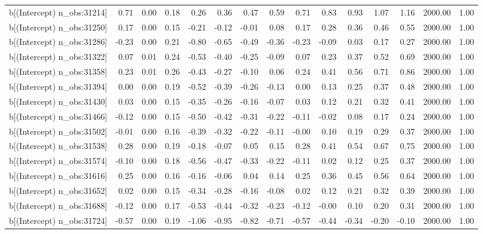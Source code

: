 \begin{table}[ht]
\begin{tabular}{rrrrrrrrrrrrrrr}
  b[(Intercept) n\_obs:31214] & 0.71 & 0.00 & 0.18 & 0.26 & 0.36 & 0.47 & 0.59 & 0.71 & 0.83 & 0.93 & 1.07 & 1.16 & 2000.00 & 1.00 \\ 
  b[(Intercept) n\_obs:31250] & 0.17 & 0.00 & 0.15 & -0.21 & -0.12 & -0.01 & 0.08 & 0.17 & 0.28 & 0.36 & 0.46 & 0.55 & 2000.00 & 1.00 \\ 
  b[(Intercept) n\_obs:31286] & -0.23 & 0.00 & 0.21 & -0.80 & -0.65 & -0.49 & -0.36 & -0.23 & -0.09 & 0.03 & 0.17 & 0.27 & 2000.00 & 1.00 \\ 
  b[(Intercept) n\_obs:31322] & 0.07 & 0.01 & 0.24 & -0.53 & -0.40 & -0.25 & -0.09 & 0.07 & 0.23 & 0.37 & 0.52 & 0.69 & 2000.00 & 1.00 \\ 
  b[(Intercept) n\_obs:31358] & 0.23 & 0.01 & 0.26 & -0.43 & -0.27 & -0.10 & 0.06 & 0.24 & 0.41 & 0.56 & 0.71 & 0.86 & 2000.00 & 1.00 \\ 
  b[(Intercept) n\_obs:31394] & 0.00 & 0.00 & 0.19 & -0.52 & -0.39 & -0.26 & -0.13 & 0.00 & 0.13 & 0.25 & 0.37 & 0.48 & 2000.00 & 1.00 \\ 
  b[(Intercept) n\_obs:31430] & 0.03 & 0.00 & 0.15 & -0.35 & -0.26 & -0.16 & -0.07 & 0.03 & 0.12 & 0.21 & 0.32 & 0.41 & 2000.00 & 1.00 \\ 
  b[(Intercept) n\_obs:31466] & -0.12 & 0.00 & 0.15 & -0.50 & -0.42 & -0.31 & -0.22 & -0.11 & -0.02 & 0.08 & 0.17 & 0.24 & 2000.00 & 1.00 \\ 
  b[(Intercept) n\_obs:31502] & -0.01 & 0.00 & 0.16 & -0.39 & -0.32 & -0.22 & -0.11 & -0.00 & 0.10 & 0.19 & 0.29 & 0.37 & 2000.00 & 1.00 \\ 
  b[(Intercept) n\_obs:31538] & 0.28 & 0.00 & 0.19 & -0.18 & -0.07 & 0.05 & 0.15 & 0.28 & 0.41 & 0.54 & 0.67 & 0.75 & 2000.00 & 1.00 \\ 
  b[(Intercept) n\_obs:31574] & -0.10 & 0.00 & 0.18 & -0.56 & -0.47 & -0.33 & -0.22 & -0.11 & 0.02 & 0.12 & 0.25 & 0.37 & 2000.00 & 1.00 \\ 
  b[(Intercept) n\_obs:31616] & 0.25 & 0.00 & 0.16 & -0.16 & -0.06 & 0.04 & 0.14 & 0.25 & 0.36 & 0.45 & 0.56 & 0.64 & 2000.00 & 1.00 \\ 
  b[(Intercept) n\_obs:31652] & 0.02 & 0.00 & 0.15 & -0.34 & -0.28 & -0.16 & -0.08 & 0.02 & 0.12 & 0.21 & 0.32 & 0.39 & 2000.00 & 1.00 \\ 
  b[(Intercept) n\_obs:31688] & -0.12 & 0.00 & 0.17 & -0.53 & -0.44 & -0.32 & -0.23 & -0.12 & -0.00 & 0.10 & 0.20 & 0.31 & 2000.00 & 1.00 \\ 
  b[(Intercept) n\_obs:31724] & -0.57 & 0.00 & 0.19 & -1.06 & -0.95 & -0.82 & -0.71 & -0.57 & -0.44 & -0.34 & -0.20 & -0.10 & 2000.00 & 1.00 \\ 

\end{tabular}
\end{table}
